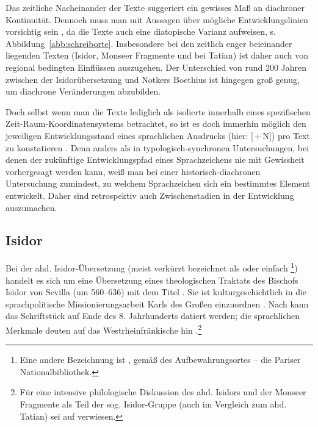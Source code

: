 Das zeitliche Nacheinander der Texte suggeriert ein gewisses Maß an diachroner Kontinuität. Dennoch muss man mit Aussagen über mögliche Entwicklungslinien  vorsichtig sein \parencite[vgl. hierzu auch][158]{Leiss2000}, da die Texte auch eine diatopische Varianz aufweisen, s. Abbildung~\ref{abb:schreiborte}. Insbesondere bei den zeitlich enger beieinander liegenden Texten (Isidor, Monseer Fragmente und bei Tatian) ist daher auch von regional bedingten Einflüssen auszugehen. Der Unterschied von rund 200 Jahren zwischen der Isidorübersetzung und Notkers Boethius ist hingegen groß genug, um diachrone Veränderungen abzubilden.


Doch selbst wenn man die Texte lediglich als isolierte  innerhalb eines spezifischen Zeit-Raum-Koordinatensystems \parencite[157]{Leiss2000} betrachtet, so ist es doch immerhin möglich den jeweiligen Entwicklungsstand eines sprachlichen Ausdrucks (hier: [\,+\,N]) pro Text
zu konstatieren \parencite[vgl. zu diesem Vorgehen auch][29]{Himmelmann1997}. Denn anders als in typologisch-synchronen Untersuchungen, bei denen der zukünftige Entwicklungspfad eines Sprachzeichens nie mit Gewissheit vorhergesagt werden kann, weiß man bei einer historisch-diachronen Untersuchung zumindest, zu welchem  Sprachzeichen sich ein bestimmtes Element entwickelt. Daher sind retrospektiv auch Zwischenstadien in der Entwicklung auszumachen.      


\subsection{Isidor} \label{sec:isidor}

Bei der  ahd. Isidor-Übersetzung (meist verkürzt bezeichnet als  oder einfach \footnote{Eine andere Bezeichnung ist , gemäß des Aufbewahrungsortes -- die Pariser Nationalbibliothek.}) handelt es sich um eine Übersetzung eines theologischen Traktats des Bischofs Isidor von Sevilla (um 560--636) mit dem Titel . Sie ist kulturgeschichtlich in die sprachpolitische Missionierungsarbeit Karls des Großen einzuordnen \parencite[vgl.][36--38]{Schlachter2012}. Nach \textcite[VIII][]{Eggers1964} kann das Schriftstück auf Ende des 8. Jahrhunderts datiert werden; die sprachlichen Merkmale deuten auf das Westrheinfränkische hin \parencite{Matzel1970}.\footnote{Für eine intensive philologische Diskussion des ahd. Isidors und der Monseer Fragmente als Teil der sog. Isidor-Gruppe (auch im Vergleich zum ahd. Tatian) sei auf \textcite[17--53]{Schlachter2012} verwiesen.} 

